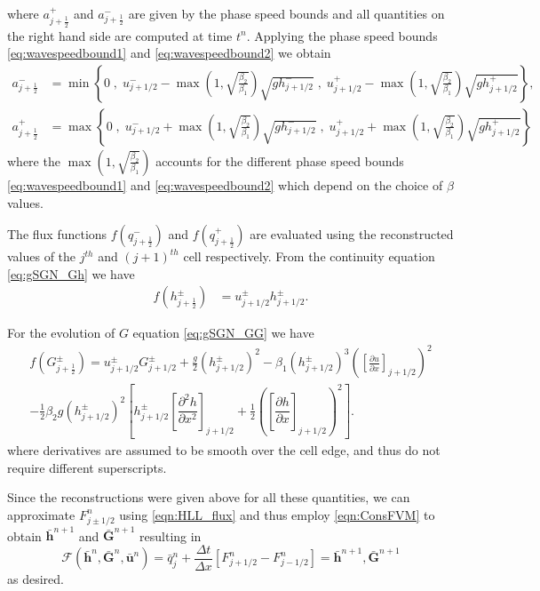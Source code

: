 \documentclass[10pt]{elsarticle}
\newcommand{\vecn}[1]{\boldsymbol{#1}}
\begin{document}
where $a^+_{j+\frac{1}{2}}$ and $a^-_{j+\frac{1}{2}}$ are given by the phase speed bounds and all quantities on the right hand side are computed at time $t^n$. Applying the phase speed bounds \eqref{eq:wavespeedbound1} and \eqref{eq:wavespeedbound2} we obtain
\begin{align}
a^-_{j+\frac{1}{2}} &= \min\left\lbrace 0\;,\;  u^-_{j + 1/2} - \max{\left(1 , \sqrt{\frac{\beta_2}{\beta_1}}\right)} \sqrt{g h^-_{j + 1/2}}  \;,\;u^+_{j + 1/2} -\max{\left(1 , \sqrt{\frac{\beta_2}{\beta_1}}\right)} \sqrt{g h^+_{j + 1/2}} \right\rbrace  ,\\
a^+_{j+\frac{1}{2}} &= \max\left\lbrace 0 \;,\;  u^-_{j + 1/2} + \max{\left(1 , \sqrt{\frac{\beta_2}{\beta_1}}\right)}\sqrt{g h^-_{j + 1/2}}  \;,\;u^+_{j + 1/2} + \max{\left(1 , \sqrt{\frac{\beta_2}{\beta_1}}\right)}\sqrt{g h^+_{j + 1/2}} \right\rbrace
\label{eqn:WaveSpeedBoundsFluxApprox}
\end{align}
where the $\max{\left(1 , \sqrt{\frac{\beta_2}{\beta_1}}\right)}$ accounts for the different phase speed bounds  \eqref{eq:wavespeedbound1} and \eqref{eq:wavespeedbound2} which depend on the choice of $\beta$ values. 

The flux functions $f(q^-_{j+\frac{1}{2}})$ and $f(q^+_{j+\frac{1}{2}})$ are evaluated using the reconstructed values of the $j^{th}$ and $(j+1)^{th}$ cell respectively. From the continuity equation \eqref{eq:gSGN_Gh} we have
\begin{align*}
f\left(h^\pm_{j+\frac{1}{2}}\right) &= u^\pm_{j + 1/2}  h^\pm_{j + 1/2}.
\end{align*}

For the evolution of $G$ equation \eqref{eq:gSGN_GG} we have 
\begin{multline}
f\left(G^\pm_{j+\frac{1}{2}}\right) =  u^\pm_{j + 1/2} G^\pm_{j + 1/2}  + \frac{g}{2}\left(h^\pm_{j + 1/2} \right)^2 - \beta_1\left(h^\pm_{j + 1/2}\right)^3 \left(\left[\frac{\partial {u}}{\partial x} \right]_{j + 1/2} \right)^2 \\ - \frac{1}{2} \beta_2 g \left(h^\pm_{j + 1/2}\right)^2  \left[h^\pm_{j + 1/2}\left[\dfrac{\partial^2 h}{\partial x^2} \right]_{j+1/2} + \frac{1}{2}\left(\left[\dfrac{\partial h}{\partial x} \right]_{j+1/2}\right)^2\right].
\end{multline}
where derivatives are assumed to be smooth over the cell edge, and thus do not require different superscripts.

Since the reconstructions were given above for all these quantities, we can approximate $F^n_{j\pm1/2}$ using \eqref{eqn:HLL_flux} and thus employ \eqref{eqn:ConsFVM} to obtain $\bar{\vecn{h}}^{n+1}$ and $\bar{\vecn{G}}^{n+1}$ resulting in
\begin{equation}
\mathcal{F}\left(\bar{\vecn{h}}^n,\bar{\vecn{G}}^n,\bar{{\vecn{u}}}^n\right) =   \bar{q}^{n}_j  +  \dfrac{\Delta t}{\Delta x}\left[F^n_{j+1/2} - F^n_{j-1/2}\right] = \bar{\vecn{h}}^{n+1 },\bar{\vecn{G}}^{n+1}
\label{eq:F_secondord}
\end{equation}
as desired. 
\end{document}

